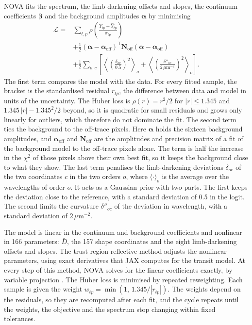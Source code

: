 NOVA fits the spectrum, the limb-darkening offsets and slopes, the continuum
coefficients $\bm{\beta}$ and the background amplitudes $\bm{\alpha}$ by
minimising
\begin{equation}
\begin{split}
 \mathcal{L} ={}& \sum_{t,p}\rho\!\left(\frac{Y_{tp}-\widehat Y_{tp}}{\sigma_{tp}}\right)\\
 &+\frac{1}{2}(\bm{\alpha}-\bm{\alpha}_{\mathrm{off}})^{\mathsf T}
   \bm{N}_{\mathrm{off}}(\bm{\alpha}-\bm{\alpha}_{\mathrm{off}}) \\
 &+\frac{1}{2}\sum_{o,c}\left[\left\langle\left(\frac{\delta_{oc}}{0.5}\right)^{2}\right\rangle_{o}
 +\left\langle\left(\frac{\delta''_{oc}}{2\,\mu\mathrm{m}^{-2}}\right)^{2}\right\rangle_{o}\right].
\end{split}
 \label{eq:objective}
\end{equation}
The first term compares the model with the data. For every fitted sample, the
bracket is the standardised residual $r_{tp}$, the difference between data and
model in units of the uncertainty. The Huber loss \citep{Huber1964} is $\rho(r)=r^2/2$ for
$|r|\leq1.345$ and $1.345\,|r|-1.345^2/2$ beyond, so it is quadratic for small
residuals and grows only linearly for outliers, which therefore do not
dominate the fit. The second term ties the background to the off-trace pixels. Here $\bm{\alpha}$ holds the
sixteen background amplitudes, and $\bm{\alpha}_{\mathrm{off}}$ and
$\bm{N}_{\mathrm{off}}$ are the amplitudes and precision matrix of a fit of
the background model to the off-trace pixels alone. The term is half the
increase in the $\chi^2$ of those pixels above their own best fit, so it keeps
the background close to what they show.
The last term penalises the limb-darkening deviations $\delta_{oc}$ of the two
coordinates $c$ in the two orders $o$, where $\langle\cdot\rangle_o$ is the
average over the wavelengths of order $o$. It acts as a Gaussian prior with
two parts. The first keeps the deviation close to the reference, with a
standard deviation of 0.5 in the logit. The second limits the curvature $\delta''_{oc}$ of the
deviation in wavelength, with a standard deviation of $2\,\mu\mathrm{m}^{-2}$.

The model is linear in the continuum and background coefficients and
nonlinear in 166 parameters: $\bar D$, the 157 shape coordinates and the eight
limb-darkening offsets and slopes. The trust-region reflective method \citep{BranchColemanLi1999} adjusts the
nonlinear parameters, using exact derivatives that JAX computes for the transit
model. At every step of this method, NOVA solves for the linear coefficients
exactly, by variable projection \citep{GolubPereyra1973}. The
Huber loss is minimised by repeated reweighting. Each sample is given the weight
$w_{tp}=\min(1,\,1.345/|r_{tp}|)$. The weights depend on the residuals, so they are
recomputed after each fit, and the cycle repeats until the weights, the
objective and the spectrum stop changing within fixed tolerances.

